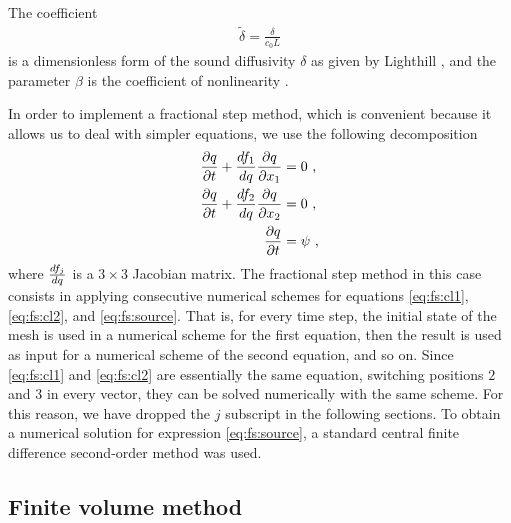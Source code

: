 The coefficient 
\begin{align}
  \label{eq:phi-tdelta}
  \tilde{\delta} = \frac{\delta}{c_0 L}
\end{align}
is a dimensionless form of the sound diffusivity $\delta$ as given by Lighthill \citep{lighthill},
and the parameter $\beta$ is the coefficient of nonlinearity \citep{beyer1998parameter}.

In order to implement a fractional step method, which is convenient because it allows us to deal with simpler equations, we use the following decomposition
\begin{align}
  \label{eq:fs:cl1}
  \frac{\partial q}{\partial t} + \frac{d f_1}{d q}\frac{\partial q}{\partial x_1} &= 0 \ \text{,}\\
  \label{eq:fs:cl2}
  \frac{\partial q}{\partial t} + \frac{d f_2}{d q}\frac{\partial q}{\partial x_2} &= 0 \ \text{,}\\
  \label{eq:fs:source}
  \frac{\partial q}{\partial t} &= \psi \ \text{,}
\end{align}
where $\frac{d f_j}{d q}$ is a $3\times 3$ Jacobian matrix. 
The fractional step method in this case consists in applying consecutive numerical schemes for equations \eqref{eq:fs:cl1}, \eqref{eq:fs:cl2}, and \eqref{eq:fs:source}.
That is, for every time step, the initial state of the mesh is used in a numerical scheme for the first equation, then the result is used as input for a numerical scheme of the second equation, and so on.
Since \eqref{eq:fs:cl1} and \eqref{eq:fs:cl2} are essentially the same equation, switching positions $2$ and $3$ in every vector, they can be solved numerically with the same scheme. 
For this reason, we have dropped the $j$ subscript in the following sections. To obtain a numerical solution for expression \eqref{eq:fs:source}, a standard central finite difference second-order method was used.

\subsection{Finite volume method}
\label{sec:finite-volume-method}

